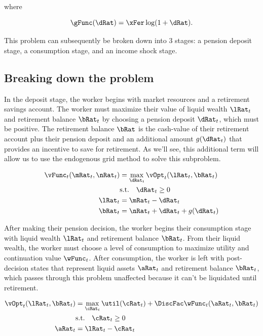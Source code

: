 \documentclass[\econtexRoot/SequentialEGM]{subfiles}
\begin{document}
where

\begin{equation}
	\gFunc(\dRat) = \xFer \log(1+\dRat).
\end{equation}

This problem can subsequently be broken down into 3 stages: a pension deposit stage, a consumption stage, and an income shock stage.

\subsection{Breaking down the problem}

In the deposit stage, the worker begins with market resources and a retirement savings account. The worker must maximize their value of liquid wealth $\lRat_{t}$ and retirement balance $\bRat_{t}$ by choosing a pension deposit $\dRat_{t}$, which must be positive. The retirement balance $\bRat$ is the cash-value of their retirement account plus their pension deposit and an additional amount $g(\dRat_{t})$ that provides an incentive to save for retirement. As we'll see, this additional term will allow us to use the endogenous grid method to solve this subproblem.

\begin{equation}
	\begin{split}
		\vFunc_{t}(\mRat_{t}, \nRat_{t}) & = \max_{\dRat_{t}} \vOpt_{t}(\lRat_{t}, \bRat_{t}) \\
		& \text{s.t.}  \quad \dRat_{t} \ge 0 \\
		\lRat_{t} & = \mRat_{t} - \dRat_{t} \\
		\bRat_{t} & = \nRat_{t} + \dRat_{t} + g(\dRat_{t})
	\end{split}
\end{equation}

After making their pension decision, the worker begins their consumption stage with liquid wealth $\lRat_{t}$ and retirement balance $\bRat_{t}$. From their liquid wealth, the worker must choose a level of consumption to maximize utility and continuation value $\wFunc_{t}$. After consumption, the worker is left with post-decision states that represent liquid assets $\aRat_{t}$ and retirement balance $\bRat_{t}$, which passes through this problem unaffected because it can't be liquidated until retirement.

\begin{equation}
	\begin{split}
		\vOpt_{t}(\lRat_{t}, \bRat_{t}) & = \max_{\cRat_{t}} \util(\cRat_{t}) + \DiscFac \wFunc_{t}(\aRat_{t}, \bRat_{t})  \\
		& \text{s.t.} \quad \cRat_{t} \ge 0 \\
		\aRat_{t} & = \lRat_{t} - \cRat_{t}
	\end{split}
\end{equation}
\end{document}
